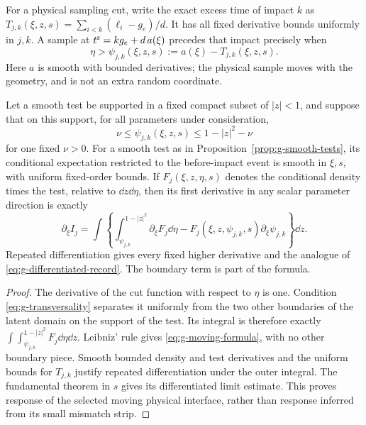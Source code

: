 For a physical sampling cut, write the exact excess time of impact $k$
as $T_{j,k}(\xi,z,s)=\sum_{i<k}(\ell_i-g_e)/d$.
It has all fixed derivative bounds uniformly in $j,k$. A sample at
$t^{\rm s}=kg_e+d\,a(\xi)$ precedes that impact precisely when
\[
                 \eta>\psi_{j,k}(\xi,z,s):=
                               a(\xi)-T_{j,k}(\xi,z,s).
\]
Here $a$ is smooth with bounded derivatives; the physical sample moves
with the geometry, and is not an extra random coordinate.

\begin{proposition}
\label{prop:g-moving-cut}
Let a smooth test be supported in a fixed compact subset of $|z|<1$,
and suppose that on this support, for all parameters under consideration,
\begin{equation}\label{eq:g-transversality}
       \nu\le\psi_{j,k}(\xi,z,s)\le1-|z|^2-\nu
\end{equation}
for one fixed $\nu>0$. For a smooth test as in
Proposition~\ref{prop:g-smooth-tests}, its conditional expectation
restricted to the before-impact event is smooth in $\xi,s$, with
uniform fixed-order bounds. If $F_j(\xi,z,\eta,s)$ denotes the
conditional density times the test, relative to $\dd z\dd\eta$, then
its first derivative in any scalar parameter direction is exactly
\begin{equation}\label{eq:g-moving-formula}
 \partial_\xi I_j=
 \int\left\{\int_{\psi_{j,k}}^{1-|z|^2}\partial_\xi F_j\dd\eta
       -F_j(\xi,z,\psi_{j,k},s)\partial_\xi\psi_{j,k}\right\}\dd z.
\end{equation}
Repeated differentiation gives every fixed higher derivative and the
analogue of \eqref{eq:g-differentiated-record}. The boundary term is
part of the formula.
\end{proposition}
\begin{proof}
The derivative of the cut function with respect to $\eta$ is one.
Condition \eqref{eq:g-transversality} separates it uniformly from the
two other boundaries of the latent domain on the support of the test.
Its integral is therefore exactly
$\int\int_{\psi_{j,k}}^{1-|z|^2}F_j\dd\eta\dd z$.
Leibniz' rule gives \eqref{eq:g-moving-formula}, with no other boundary
piece. Smooth bounded density and test derivatives and the uniform
bounds for $T_{j,k}$ justify repeated differentiation under the outer
integral. The fundamental theorem in $s$ gives its differentiated
limit estimate. This proves response of the selected moving physical
interface, rather than response inferred from its small mismatch strip.
\end{proof}

